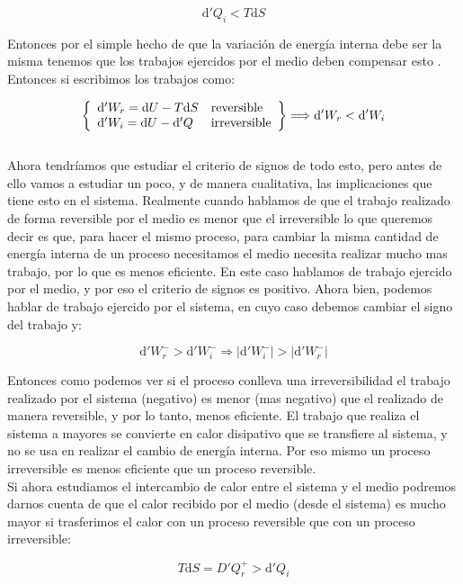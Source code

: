 \documentclass[12pt,a4paper]{article}
\newcommand{\D}{\mathrm{d}}
\begin{document}
$$ \D'  Q_i < T \D S $$ 

Entonces por el simple hecho de que la variación de energía interna debe ser la misma tenemos que los trabajos ejercidos por el medio deben compensar esto . Entonces si escribimos los trabajos como:


\begin{equation}
\left\lbrace \begin{array}{l l}
\D ' W_r = \D U - T \D S & \text{reversible}\\ 
\D ' W_i = \D U - \D ' Q  & \text{irreversible}\\ 
\end{array} \right\rbrace \Longrightarrow \D ' W_r < \D ' W_i
\end{equation} \\


Ahora tendríamos que estudiar el criterio de signos de todo esto, pero antes de ello vamos a estudiar un poco, y de manera cualitativa, las implicaciones que tiene esto en el sistema. Realmente cuando hablamos de que el trabajo realizado de forma reversible por el medio es menor que el irreversible lo que queremos decir es que, para hacer el mismo proceso, para cambiar la misma cantidad de energía interna de un proceso necesitamos el medio necesita realizar mucho mas trabajo, por lo que es menos eficiente. En este caso hablamos de trabajo ejercido por el medio, y por eso el criterio de signos es positivo. Ahora bien, podemos hablar de trabajo ejercido por el sistema, en cuyo caso debemos cambiar el signo del trabajo y:

$$ \D ' W_r^- > \D ' W_i^- \Longrightarrow |\D ' W_i^- | >  |\D ' W_r^- | $$

Entonces como podemos ver si el proceso conlleva una irreversibilidad el trabajo realizado por el sistema (negativo) es menor (mas negativo) que el realizado de manera reversible, y por lo tanto, menos eficiente. El trabajo que realiza el sistema a mayores se convierte en calor disipativo que se transfiere al sistema, y no se usa en realizar el cambio de energía interna. Por eso mismo un proceso irreversible es menos eficiente que un proceso reversible.  \\

Si ahora estudiamos el intercambio de calor entre el sistema y el medio podremos darnos cuenta de que el calor recibido por el medio (desde el sistema) es mucho mayor si trasferimos el calor con un proceso reversible que con un proceso irreversible:

$$ T \D S  = D ' Q_r^+ > \D'  Q_i $$
\end{document}
